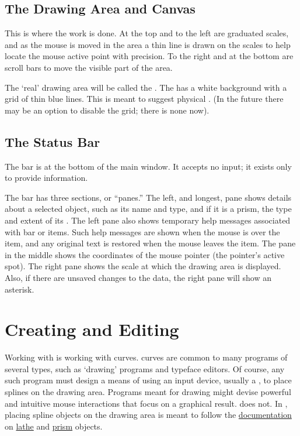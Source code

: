 		\subsection{The Drawing Area and Canvas}%
		This is where the work is done. At the top and
		to the left are graduated scales, and as the mouse
		is moved in the  area a thin line
		is drawn on the scales to help locate the mouse active
		point with precision. To the right and at the bottom
		are scroll bars to move the visible part of the
		 area.
		
		The `real' drawing area will be called the
		.
		The  has a white background with a grid
		of thin blue lines. This is meant to suggest physical
		. (In the future there
		may be an option to disable the grid; there is none now).


		\subsection{The Status Bar}%
		The  bar is at the bottom of
		the main window. It accepts no input; it exists
		only to provide information.
		
		The 
		bar has three sections, or ``panes.'' The left, and
		longest, pane shows details about a selected object,
		such as its name and type, and if it is a prism, the
		type and extent of its . The left
		pane also shows temporary help messages associated
		with  bar or  items. Such help
		messages are shown when the mouse is over the item, and
		any original text is restored when the mouse leaves the item.
		The pane in the middle shows the coordinates of the
		mouse pointer (the pointer's active spot). The right
		pane shows the scale at which the drawing area is displayed.
		Also, if there are unsaved changes to the data, the
		right pane will show an asterisk.


	\section{Creating and Editing}%
	Working with \IXpkg{} is working with  curves.
	 curves are common to many programs of
	several types, such as `drawing' programs and typeface
	editors. Of course, any such program must design a
	means of using an input device, usually a ,
	to place splines on the drawing area. Programs meant
	for drawing might devise powerful and intuitive mouse
	interactions that focus on a graphical result.
	\IXpkgu{} does not. In \IXpkg{}, placing spline
	objects on the drawing area is meant to follow the
	\IXpov{} \href{\URLPOVdocs}{documentation}
	on
	\href{\URLPOVdocsLathe}{lathe}
	and
	\href{\URLPOVdocsPrism}{prism}
	objects.

